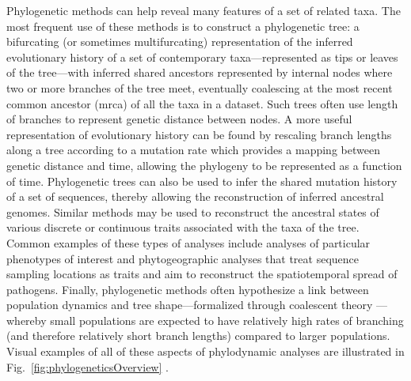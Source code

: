 
Phylogenetic methods can help reveal many features of a set of related taxa.
The most frequent use of these methods is to construct a phylogenetic tree: a bifurcating (or sometimes multifurcating) representation of the inferred evolutionary history of a set of contemporary taxa---represented as tips or leaves of the tree---with inferred shared ancestors represented by internal nodes where two or more branches of the tree meet, eventually coalescing at the most recent common ancestor (\gls{mrca}) of all the taxa in a dataset.
Such trees often use length of branches to represent genetic distance between nodes.
A more useful representation of evolutionary history can be found by rescaling branch lengths along a tree according to a mutation rate which provides a mapping between genetic distance and time, allowing the phylogeny to be represented as a function of time.
Phylogenetic trees can also be used to infer the shared mutation history of a set of sequences, thereby allowing the reconstruction of inferred ancestral genomes.
Similar methods may be used to reconstruct the ancestral states of various discrete or continuous traits associated with the taxa of the tree.
Common examples of these types of analyses include analyses of particular phenotypes of interest and phytogeographic analyses that treat sequence sampling locations as traits and aim to reconstruct the spatiotemporal spread of pathogens.
Finally, phylogenetic methods often hypothesize a link between population dynamics and tree shape---formalized through coalescent theory \cite{Kingman1982}---whereby small populations are expected to have relatively high rates of branching (and therefore relatively short branch lengths) compared to larger populations.
Visual examples of all of these aspects of phylodynamic analyses are illustrated in Fig.~\ref{fig:phylogeneticsOverview} \cite{pybus2009evolutionary}.

